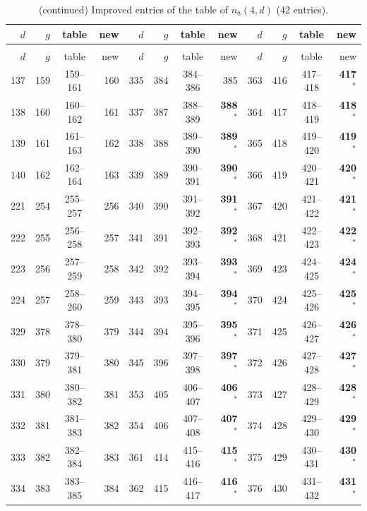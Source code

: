 \begin{longtable}{rrcr|rrcr|rrcr}
\caption{Improved entries of the table of $n_8(4,d)$ (42 entries).}\label{tab:q8}\\
\toprule
$d$ & $g$ & table & new & $d$ & $g$ & table & new & $d$ & $g$ & table & new \\
\midrule
\endfirsthead
\caption[]{(continued) Improved entries of the table of $n_8(4,d)$ (42 entries).}\\
\toprule
$d$ & $g$ & table & new & $d$ & $g$ & table & new & $d$ & $g$ & table & new \\
\midrule
\endhead
137 & 159 & 159--161 & 160 & 335 & 384 & 384--386 & 385 & 363 & 416 & 417--418 & \textbf{417}$^{*}$ \\
138 & 160 & 160--162 & 161 & 337 & 387 & 388--389 & \textbf{388}$^{*}$ & 364 & 417 & 418--419 & \textbf{418}$^{*}$ \\
139 & 161 & 161--163 & 162 & 338 & 388 & 389--390 & \textbf{389}$^{*}$ & 365 & 418 & 419--420 & \textbf{419}$^{*}$ \\
140 & 162 & 162--164 & 163 & 339 & 389 & 390--391 & \textbf{390}$^{*}$ & 366 & 419 & 420--421 & \textbf{420}$^{*}$ \\
221 & 254 & 255--257 & 256 & 340 & 390 & 391--392 & \textbf{391}$^{*}$ & 367 & 420 & 421--422 & \textbf{421}$^{*}$ \\
222 & 255 & 256--258 & 257 & 341 & 391 & 392--393 & \textbf{392}$^{*}$ & 368 & 421 & 422--423 & \textbf{422}$^{*}$ \\
223 & 256 & 257--259 & 258 & 342 & 392 & 393--394 & \textbf{393}$^{*}$ & 369 & 423 & 424--425 & \textbf{424}$^{*}$ \\
224 & 257 & 258--260 & 259 & 343 & 393 & 394--395 & \textbf{394}$^{*}$ & 370 & 424 & 425--426 & \textbf{425}$^{*}$ \\
329 & 378 & 378--380 & 379 & 344 & 394 & 395--396 & \textbf{395}$^{*}$ & 371 & 425 & 426--427 & \textbf{426}$^{*}$ \\
330 & 379 & 379--381 & 380 & 345 & 396 & 397--398 & \textbf{397}$^{*}$ & 372 & 426 & 427--428 & \textbf{427}$^{*}$ \\
331 & 380 & 380--382 & 381 & 353 & 405 & 406--407 & \textbf{406}$^{*}$ & 373 & 427 & 428--429 & \textbf{428}$^{*}$ \\
332 & 381 & 381--383 & 382 & 354 & 406 & 407--408 & \textbf{407}$^{*}$ & 374 & 428 & 429--430 & \textbf{429}$^{*}$ \\
333 & 382 & 382--384 & 383 & 361 & 414 & 415--416 & \textbf{415}$^{*}$ & 375 & 429 & 430--431 & \textbf{430}$^{*}$ \\
334 & 383 & 383--385 & 384 & 362 & 415 & 416--417 & \textbf{416}$^{*}$ & 376 & 430 & 431--432 & \textbf{431}$^{*}$ \\
\bottomrule
\end{longtable}
